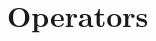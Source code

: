 \documentclass{manual}
\begin{document}
%
%
%
%
%
%
%
%
% 
% 
%
% 
%
% 
%
% 
% 
%
% 
%
%
% 
%
%
%
%
%
%
%
%

\section{Operators}
\end{document}
